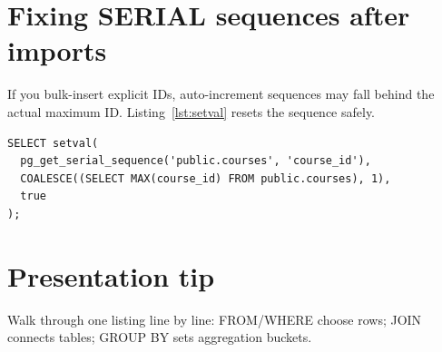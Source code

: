 \section{Fixing SERIAL sequences after imports}
If you bulk-insert explicit IDs, auto-increment sequences may fall behind the actual maximum ID. Listing~\ref{lst:setval} resets the sequence safely.

\begin{lstlisting}[caption={Align SERIAL sequence with current max ID},label={lst:setval}]
SELECT setval(
  pg_get_serial_sequence('public.courses', 'course_id'),
  COALESCE((SELECT MAX(course_id) FROM public.courses), 1),
  true
);
\end{lstlisting}

\section{Presentation tip}
Walk through one listing line by line: FROM/WHERE choose rows; JOIN connects tables; GROUP BY sets aggregation buckets.

